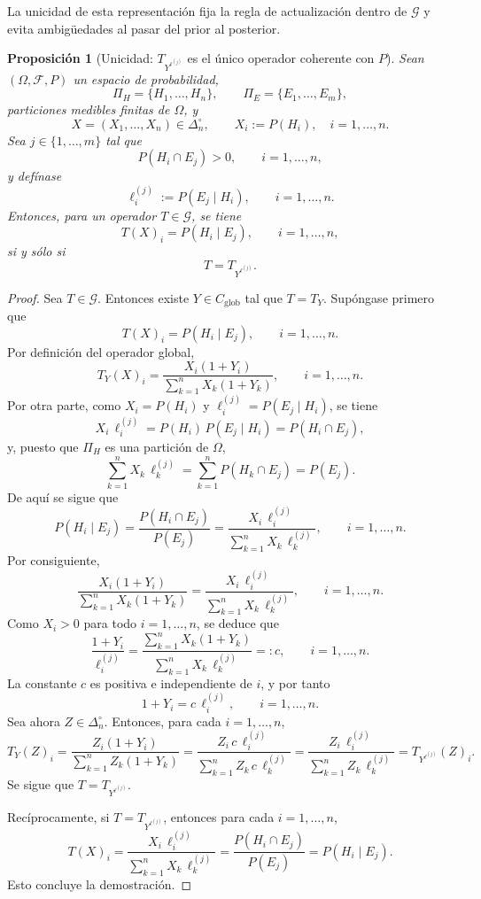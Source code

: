 ﻿\documentclass[12pt]{article}
\newtheorem{proposicion}{Proposición}[section]
\begin{document}
La unicidad de esta representación fija la regla de actualización dentro de $\mathcal G$ y evita ambigüedades al pasar del prior al posterior.


\begin{proposicion}[Unicidad: $T_{Y^{\ell^{(j)}}}$ es el único operador coherente con $P$]\label{prop:unicidad_bayes}
Sean $(\Omega,\mathcal F,P)$ un espacio de probabilidad,
\[
\Pi_H=\{H_1,\dots,H_n\},
\qquad
\Pi_E=\{E_1,\dots,E_m\},
\]
particiones medibles finitas de $\Omega$, y
\[
X=(X_1,\dots,X_n)\in\Delta_n^\circ,
\qquad
X_i:=P(H_i),\quad i=1,\dots,n.
\]
Sea $j\in\{1,\dots,m\}$ tal que
\[
P(H_i\cap E_j)>0,\qquad i=1,\dots,n,
\]
y defínase
\[
\ell_i^{(j)}:=P(E_j\mid H_i),\qquad i=1,\dots,n.
\]
Entonces, para un operador $T\in\mathcal G$, se tiene
\[
T(X)_i=P(H_i\mid E_j),\qquad i=1,\dots,n,
\]
si y sólo si
\[
T=T_{Y^{\ell^{(j)}}}.
\]
\end{proposicion}

\begin{proof}
Sea $T\in\mathcal G$. Entonces existe $Y\in C_{\mathrm{glob}}$ tal que $T=T_Y$. Supóngase primero que
\[
T(X)_i=P(H_i\mid E_j),\qquad i=1,\dots,n.
\]
Por definición del operador global,
\[
T_Y(X)_i
=
\frac{X_i(1+Y_i)}{\sum_{k=1}^n X_k(1+Y_k)},
\qquad i=1,\dots,n.
\]
Por otra parte, como $X_i=P(H_i)$ y $\ell_i^{(j)}=P(E_j\mid H_i)$, se tiene
\[
X_i\,\ell_i^{(j)}=P(H_i)\,P(E_j\mid H_i)=P(H_i\cap E_j),
\]
y, puesto que $\Pi_H$ es una partición de $\Omega$,
\[
\sum_{k=1}^n X_k\,\ell_k^{(j)}
=
\sum_{k=1}^n P(H_k\cap E_j)
=
P(E_j).
\]
De aquí se sigue que
\[
P(H_i\mid E_j)
=
\frac{P(H_i\cap E_j)}{P(E_j)}
=
\frac{X_i\,\ell_i^{(j)}}{\sum_{k=1}^n X_k\,\ell_k^{(j)}},
\qquad i=1,\dots,n.
\]
Por consiguiente,
\[
\frac{X_i(1+Y_i)}{\sum_{k=1}^n X_k(1+Y_k)}
=
\frac{X_i\,\ell_i^{(j)}}{\sum_{k=1}^n X_k\,\ell_k^{(j)}},
\qquad i=1,\dots,n.
\]
Como $X_i>0$ para todo $i=1,\dots,n$, se deduce que
\[
\frac{1+Y_i}{\ell_i^{(j)}}
=
\frac{\sum_{k=1}^n X_k(1+Y_k)}{\sum_{k=1}^n X_k\,\ell_k^{(j)}}
=:c,
\qquad i=1,\dots,n.
\]
La constante $c$ es positiva e independiente de $i$, y por tanto
\[
1+Y_i=c\,\ell_i^{(j)},\qquad i=1,\dots,n.
\]
Sea ahora $Z\in\Delta_n^\circ$. Entonces, para cada $i=1,\dots,n$,
\[
T_Y(Z)_i
=
\frac{Z_i(1+Y_i)}{\sum_{k=1}^n Z_k(1+Y_k)}
=
\frac{Z_i\,c\,\ell_i^{(j)}}{\sum_{k=1}^n Z_k\,c\,\ell_k^{(j)}}
=
\frac{Z_i\,\ell_i^{(j)}}{\sum_{k=1}^n Z_k\,\ell_k^{(j)}}
=
T_{Y^{\ell^{(j)}}}(Z)_i.
\]
Se sigue que $T=T_{Y^{\ell^{(j)}}}$.

Recíprocamente, si $T=T_{Y^{\ell^{(j)}}}$, entonces para cada $i=1,\dots,n$,
\[
T(X)_i
=
\frac{X_i\,\ell_i^{(j)}}{\sum_{k=1}^n X_k\,\ell_k^{(j)}}
=
\frac{P(H_i\cap E_j)}{P(E_j)}
=
P(H_i\mid E_j).
\]
Esto concluye la demostración.
\end{proof}
\end{document}
